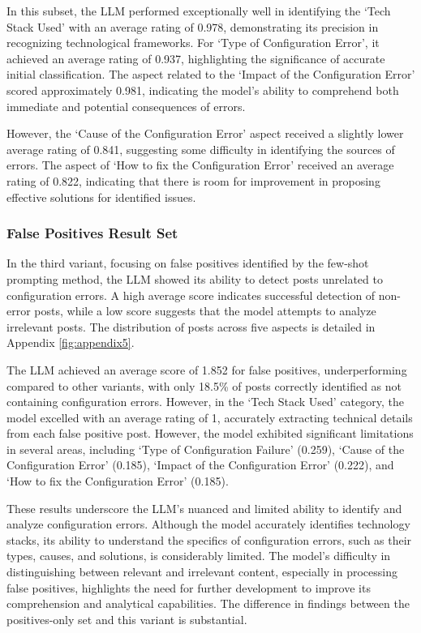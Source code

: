 \documentclass[english,bachelor]{swsLeipzig}
\begin{document}
In this subset, the LLM performed exceptionally well in identifying the `Tech Stack Used' with an average rating of 0.978, demonstrating its precision in recognizing technological frameworks. For `Type of Configuration Error', it achieved an average rating of 0.937, highlighting the significance of accurate initial classification. The aspect related to the `Impact of the Configuration Error' scored approximately 0.981, indicating the model's ability to comprehend both immediate and potential consequences of errors.

However, the `Cause of the Configuration Error' aspect received a slightly lower average rating of 0.841, suggesting some difficulty in identifying the sources of errors. The aspect of `How to fix the Configuration Error' received an average rating of 0.822, indicating that there is room for improvement in proposing effective solutions for identified issues.

\subsubsection{False Positives Result Set}

In the third variant, focusing on false positives identified by the few-shot prompting method, the LLM showed its ability to detect posts unrelated to configuration errors. A high average score indicates successful detection of non-error posts, while a low score suggests that the model attempts to analyze irrelevant posts. The distribution of posts across five aspects is detailed in Appendix \ref{fig:appendix5}.

The LLM achieved an average score of 1.852 for false positives, underperforming compared to other variants, with only 18.5\% of posts correctly identified as not containing configuration errors. However, in the `Tech Stack Used' category, the model excelled with an average rating of 1, accurately extracting technical details from each false positive post. However, the model exhibited significant limitations in several areas, including `Type of Configuration Failure' (0.259), `Cause of the Configuration Error' (0.185), `Impact of the Configuration Error' (0.222), and `How to fix the Configuration Error' (0.185).

These results underscore the LLM's nuanced and limited ability to identify and analyze configuration errors. Although the model accurately identifies technology stacks, its ability to understand the specifics of configuration errors, such as their types, causes, and solutions, is considerably limited. The model's difficulty in distinguishing between relevant and irrelevant content, especially in processing false positives, highlights the need for further development to improve its comprehension and analytical capabilities. The difference in findings between the positives-only set and this variant is substantial.
\end{document}
